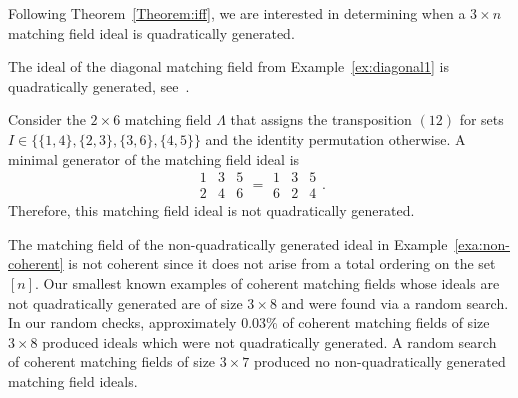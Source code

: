 \documentclass[ALCO,ThmDefs,Unicode,epreuves]{cedram}
\begin{document}
Following Theorem~\ref{Theorem:iff}, we are interested in determining when a $3\times n$ matching field ideal is quadratically generated. 



\begin{exam}
The ideal of the diagonal matching field from Example~\ref{ex:diagonal1} is quadratically generated,
see~\cite[Theorem~14.16]{CCA}. 
\end{exam}



\begin{exam}\label{exa:non-coherent}
Consider the $2\times 6$ matching field $\Lambda$ that assigns the transposition $(1 2)$ for sets $I \in \{\{1, 4\}, \{2,3\}, \{3,6\}, \{4,5\}\}$ and the identity permutation otherwise. 
A minimal generator of the matching field ideal is 
\[
\begin{array}{c}1 \\2\end{array} 
\begin{array}{c}3 \\4 \end{array}
\begin{array}{c}5 \\6 \end{array} 
= 
\begin{array}{c}1 \\6 \end{array} 
\begin{array}{c}3 \\2\end{array} 
\begin{array}{c}5 \\4 \end{array}.
\]
Therefore, this matching field ideal is not quadratically generated.

\end{exam}

\begin{Remark}The matching field of the non-quadratically generated ideal in Example~\ref{exa:non-coherent} is not coherent since it does not arise from a total ordering on the set $[n]$. Our smallest known examples of coherent matching fields whose ideals are not quadratically generated are of size $3 \times 8$ and were found via a random search. In our random checks, approximately $0.03 \%$ of coherent matching fields of size $3 \times 8$ produced ideals which were not quadratically generated. A random search of coherent matching fields of size $3 \times 7$ produced no non-quadratically generated matching field ideals.
\end{Remark}
\end{document}
